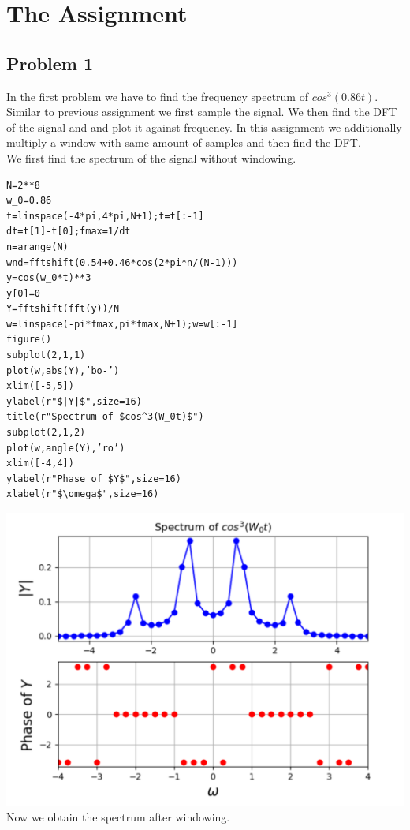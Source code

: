 \documentclass[10pt,english, openany]{book}
\begin{document}
\chapter{The Assignment}

\section{Problem 1}
In the first problem we have to find the frequency spectrum of $cos^{3}(0.86t)$. Similar to previous assignment we first sample the signal. We then find the DFT of the signal and and plot it against frequency. In this assignment we additionally multiply a window with same amount of samples and then find the DFT.\\
We first find the spectrum of the signal without windowing.\\
\begin{verbatim}
N=2**8 
w_0=0.86
t=linspace(-4*pi,4*pi,N+1);t=t[:-1] 
dt=t[1]-t[0];fmax=1/dt
n=arange(N) 
wnd=fftshift(0.54+0.46*cos(2*pi*n/(N-1)))
y=cos(w_0*t)**3
y[0]=0
Y=fftshift(fft(y))/N 
w=linspace(-pi*fmax,pi*fmax,N+1);w=w[:-1]
figure()
subplot(2,1,1)
plot(w,abs(Y),’bo-’)
xlim([-5,5])
ylabel(r"$|Y|$",size=16)
title(r"Spectrum of $cos^3(W_0t)$") 
subplot(2,1,2)
plot(w,angle(Y),’ro’)
xlim([-4,4])
ylabel(r"Phase of $Y$",size=16) 
xlabel(r"$\omega$",size=16)
\end{verbatim}
{\centering \includegraphics[scale=0.3]{Figure5.png}}\\
Now we obtain the spectrum after windowing.
\end{document}
